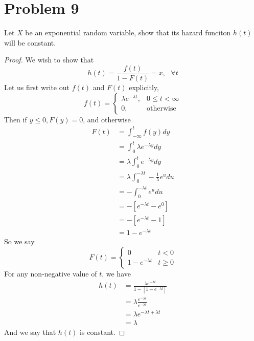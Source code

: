 \documentclass{article}
\begin{document}
\section*{Problem 9}
    Let $X$ be an exponential random variable, show that its hazard funciton $h(t)$ will be constant.
    \begin{proof}
        We wish to show that 
        \[
            h(t) = \frac{f(t)}{1- F(t)} = x, \ \ \ \forall t
        \]
        Let us first write out $f(t)$ and $F(t)$ explicitly,
        \[
            f(t) =
            \begin{cases}
                \lambda e^{- \lambda t}, & 0 \leq t < \infty\\
                0, & \text{otherwise}
            \end{cases}
        \]
        Then if $y \leq 0, F(y) = 0$, and otherwise
        \begin{align*}
            F(t) &= \int_{-\infty}^t f(y) dy\\
            &= \int_0^t \lambda e^{- \lambda y} dy\\
            &= \lambda \int_0^t e^{- \lambda y} dy\\
            &= \lambda \int_0^{- \lambda t} -\frac{1}{\lambda} e^u du\\
            &= -\int_0^{- \lambda t} e^u du\\
            &= -[e^{- \lambda t} - e^0]\\
            &= -[e^{- \lambda t} - 1]\\
            &= 1 - e^{- \lambda t}
        \end{align*}
        So we say
        \[
            F(t) = 
            \begin{cases}
                0 & t < 0\\
                1 - e^{- \lambda t} & t \geq 0
            \end{cases}
        \]
        For any non-negative value of $t$, we have
        \begin{align*}
            h(t) &= \frac{\lambda e^{-\lambda t}}{1- [1 - e^{-\lambda t}]}\\
            &= \lambda \frac{e^{-\lambda t}}{e^{-\lambda t}}\\
            &= \lambda  e^{- \lambda t + \lambda t}\\
            & = \lambda 
        \end{align*}
        And we say that $h(t)$ is constant.
    \end{proof}
\end{document}
